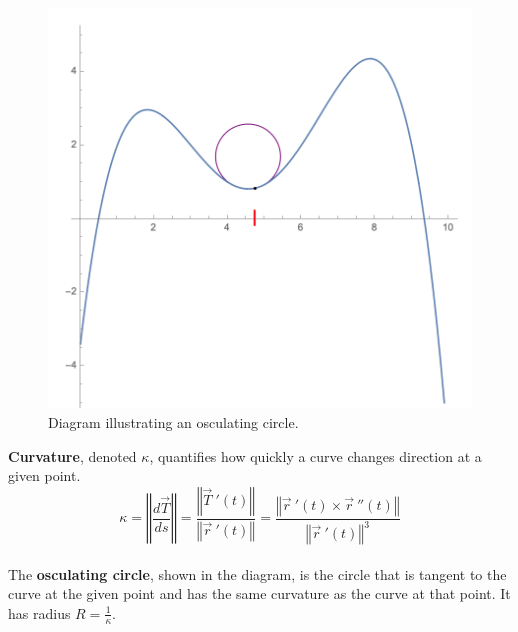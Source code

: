 \begin{figure}[!h]
\centering
\includegraphics[width=.75\textwidth]{curvature_picture.png}
\caption{Diagram illustrating an osculating circle.}
\end{figure}
\hspace*{-.5in}
\textbf{Curvature}, denoted \(\kappa\), quantifies how quickly a curve changes direction at a given point. 
\[
\kappa = \left\Vert \frac{d\vec{T}}{ds}\right\Vert = \frac{\left\Vert\vec{T}\ '(t)\right\Vert}{\left\Vert\vec{r}\ '(t)\right\Vert} = \frac{\left\Vert\vec{r}\ '(t)\times \vec{r}\ ''(t)\right\Vert}{\left\Vert\vec{r}\ '(t)\right\Vert^3}
\]
~\\
The \textbf{osculating circle}, shown in the diagram, is the circle that is tangent to the curve at the given point and has the same curvature as the curve at that point. It has radius \(R=\frac{1}{\kappa}\).

